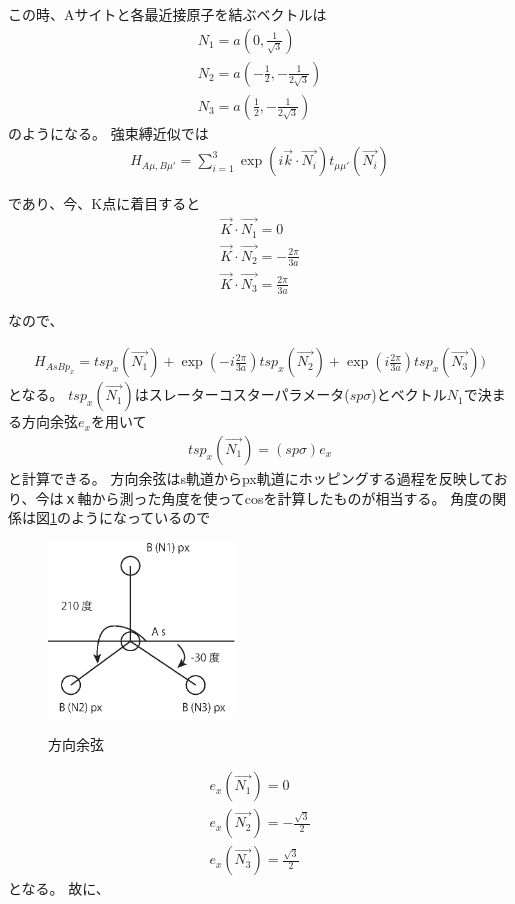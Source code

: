 \documentclass{article}
\begin{document}
この時、Aサイトと各最近接原子を結ぶベクトルは
\begin{eqnarray}
N_1=a(0, \frac{1}{\sqrt{3}}) \\
N_2=a(-\frac{1}{2}, -\frac{1}{2\sqrt{3}}) \\
N_3=a(\frac{1}{2}, -\frac{1}{2\sqrt{3}})
\end{eqnarray}
のようになる。
強束縛近似では
\begin{eqnarray}
H_{A\mu, B\mu'}=\sum_{i=1}^3 \exp (i\vec{k}\cdot\vec{N_i})
t_{\mu\mu'}(\vec{N_i})
\end{eqnarray}

であり、今、K点に着目すると
\begin{eqnarray}
\vec{K}\cdot\vec{N_1}=0 \\
\vec{K}\cdot\vec{N_2}=-\frac{2\pi}{3a} \\
\vec{K}\cdot\vec{N_3}=\frac{2\pi}{3a}
\end{eqnarray}

なので、

\begin{eqnarray}
H_{As Bp_x}=tsp_x(\vec{N_1})+\exp (-i\frac{2\pi}{3a})tsp_x(\vec{N_2})+\exp
(i\frac{2\pi}{3a})tsp_x(\vec{N_3}))
\end{eqnarray}
となる。
$tsp_x(\vec{N_1})$はスレーターコスターパラメータ($sp\sigma$)とベクトル$N_1$で決まる方向余弦$e_x$を用いて
\begin{eqnarray}
tsp_x(\vec{N_1})=(sp\sigma)e_x
\end{eqnarray}
と計算できる。
方向余弦はs軌道からpx軌道にホッピングする過程を反映しており、今はｘ軸から測った角度を使ってcosを計算したものが相当する。
角度の関係は図\ref{ex1}のようになっているので
\begin{figure}[hbtp]
\centering
\includegraphics[width=5cm]{hopping1.eps}
\label{ex1}
\caption{方向余弦}
\end{figure}

\begin{eqnarray}
e_x(\vec{N_1})=0 \\
e_x(\vec{N_2})=-\frac{\sqrt{3}}{2} \\
e_x(\vec{N_3})=\frac{\sqrt{3}}{2}
\end{eqnarray}
となる。
故に、
\end{document}
